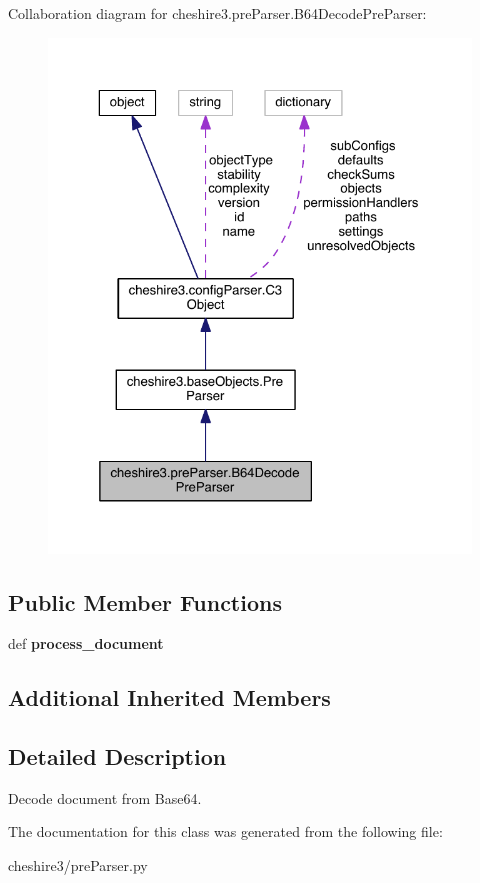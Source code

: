 Collaboration diagram for cheshire3.\-pre\-Parser.\-B64\-Decode\-Pre\-Parser\-:
\nopagebreak
\begin{figure}[H]
\begin{center}
\leavevmode
\includegraphics[width=325pt]{classcheshire3_1_1pre_parser_1_1_b64_decode_pre_parser__coll__graph}
\end{center}
\end{figure}
\subsection*{Public Member Functions}
\begin{DoxyCompactItemize}
\item 
\hypertarget{classcheshire3_1_1pre_parser_1_1_b64_decode_pre_parser_af23f9d204d1424d178fea01c9d642c46}{def {\bfseries process\-\_\-document}}\label{classcheshire3_1_1pre_parser_1_1_b64_decode_pre_parser_af23f9d204d1424d178fea01c9d642c46}

\end{DoxyCompactItemize}
\subsection*{Additional Inherited Members}


\subsection{Detailed Description}
\begin{DoxyVerb}Decode document from Base64.\end{DoxyVerb}
 

The documentation for this class was generated from the following file\-:\begin{DoxyCompactItemize}
\item 
cheshire3/pre\-Parser.\-py\end{DoxyCompactItemize}
